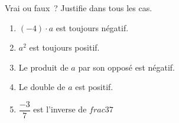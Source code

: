 %
%
    Vrai ou faux~? Justifie dans tous les cas.
    \begin{enumerate}
        \item \(( - 4) \cdot a\) est toujours négatif.
        \item \(a^{2}\) est toujours positif.
        \item Le produit de \(a\) par son opposé est négatif.
        \item Le double de \(a\) est positif.
        \item \(\dfrac{-3}{7}\) est l'inverse de \(frac{3}{7}\)
    \end{enumerate}
